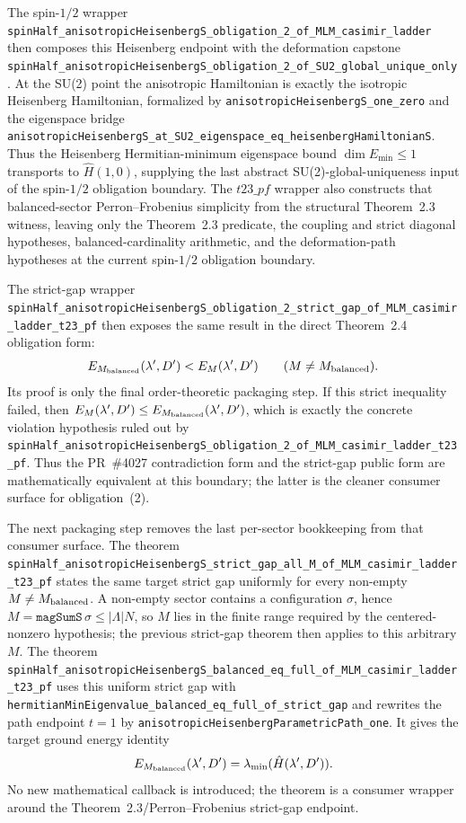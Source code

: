 \documentclass[a4paper,11pt]{article}
\begin{document}
The spin-\(1/2\) wrapper
\texttt{spinHalf\_anisotropicHeisenbergS\_obligation\_2\_of\_MLM\_casimir\_ladder}
then composes this Heisenberg endpoint with the deformation capstone
\texttt{spinHalf\_anisotropicHeisenbergS\_obligation\_2\_of\_SU2\_global\_unique\_only}.
At the SU(2) point the anisotropic Hamiltonian is exactly the isotropic
Heisenberg Hamiltonian, formalized by
\texttt{anisotropicHeisenbergS\_one\_zero} and the eigenspace bridge
\texttt{anisotropicHeisenbergS\_at\_SU2\_eigenspace\_eq\_heisenbergHamiltonianS}.
Thus the Heisenberg Hermitian-minimum eigenspace bound
\(\dim E_{\min}\le1\) transports to \(\hat H(1,0)\), supplying the last
abstract SU(2)-global-uniqueness input of the spin-\(1/2\) obligation
boundary.  The \(t23\_pf\) wrapper also constructs that balanced-sector
Perron--Frobenius simplicity from the structural Theorem~2.3 witness, leaving
only the Theorem~2.3 predicate, the coupling and strict diagonal hypotheses,
balanced-cardinality arithmetic, and the deformation-path hypotheses at the
current spin-\(1/2\) obligation boundary.

The strict-gap wrapper
\texttt{spinHalf\_anisotropicHeisenbergS\_obligation\_2\_strict\_gap\_of\_MLM\_casimir\_ladder\_t23\_pf}
then exposes the same result in the direct Theorem~2.4 obligation form:
\[
  E_{M_{\rm balanced}}(\lambda',D')
  < E_M(\lambda',D')
  \qquad (M\ne M_{\rm balanced}).
\]
Its proof is only the final order-theoretic packaging step.  If this strict
inequality failed, then \(E_M(\lambda',D')\le
E_{M_{\rm balanced}}(\lambda',D')\), which is exactly the concrete violation
hypothesis ruled out by
\texttt{spinHalf\_anisotropicHeisenbergS\_obligation\_2\_of\_MLM\_casimir\_ladder\_t23\_pf}.
Thus the PR~\#4027 contradiction form and the strict-gap public form are
mathematically equivalent at this boundary; the latter is the cleaner consumer
surface for obligation~(2).

The next packaging step removes the last per-sector bookkeeping from that
consumer surface.  The theorem
\texttt{spinHalf\_anisotropicHeisenbergS\_strict\_gap\_all\_M\_of\_MLM\_casimir\_ladder\_t23\_pf}
states the same target strict gap uniformly for every non-empty
\(M\ne M_{\rm balanced}\).  A non-empty sector contains a configuration
\(\sigma\), hence \(M=\texttt{magSumS}\,\sigma\le |\Lambda|N\), so \(M\) lies in
the finite range required by the centered-nonzero hypothesis; the previous
strict-gap theorem then applies to this arbitrary \(M\).  The theorem
\texttt{spinHalf\_anisotropicHeisenbergS\_balanced\_eq\_full\_of\_MLM\_casimir\_ladder\_t23\_pf}
uses this uniform strict gap with
\texttt{hermitianMinEigenvalue\_balanced\_eq\_full\_of\_strict\_gap} and rewrites
the path endpoint \(t=1\) by
\texttt{anisotropicHeisenbergParametricPath\_one}.  It gives the target ground
energy identity
\[
  E_{M_{\rm balanced}}(\lambda',D')
  = \lambda_{\min}(\hat H(\lambda',D')).
\]
No new mathematical callback is introduced; the theorem is a consumer wrapper
around the Theorem~2.3/Perron--Frobenius strict-gap endpoint.
\end{document}
